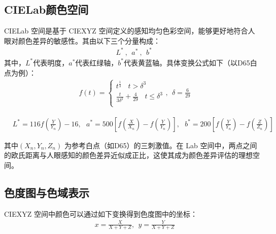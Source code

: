 \subsection[\hspace{-2pt}CIELab颜色空间]{{\heiti{} \hspace{-8pt}CIELab颜色空间}}\label{subsection2: CIELab颜色空间}

CIELab 空间是基于 CIEXYZ 空间定义的感知均匀色彩空间，能够更好地符合人眼对颜色差异的敏感性。其由以下三个分量构成：
\begin{equation}
\begin{aligned}
  &L^{*}\ ,\ \ a^{*}\ ,\ \ b^{*}\ 
\end{aligned}
\end{equation}
其中，$L^{*}$代表明度，$a^{*}$代表红绿轴，$b^{*}$代表黄蓝轴。具体变换公式如下（以D65白点为例）：
\begin{equation}
\begin{aligned}
  &f(t) = 
\begin{cases}
  t^{\frac{1}{3}}\ \ \ \ t>\delta^{3}\\
  \frac{t}{3\delta^{2}}+\frac{4}{29}\ \ \ \ t\leq \delta^{3}\\
\end{cases}
,\ \ \delta=\frac{6}{29}
\end{aligned}
\end{equation}

\begin{equation}
\begin{aligned}
  &L^{*} = 116f(\frac{Y}{Y_{n}})-16,\ \ \ a^{*}=500[f(\frac{X}{X_{n}})-f(\frac{Y}{Y_{n}})],\ \ \ b^{*} = 200[f(\frac{Y}{Y_{n}})-f(\frac{Z}{Z_{n}})]
\end{aligned}
\end{equation}

其中$(X_{n},Y_{n},Z_{n})$ 为参考白点（如D65）的三刺激值。在 Lab 空间中，两点之间的欧氏距离与人眼感知的颜色差异近似成正比，这使其成为颜色差异评估的理想空间。

\subsection[\hspace{-2pt}色度图与色域表示]{{\heiti{} \hspace{-8pt}色度图与色域表示}}\label{subsection2: 色度图与色域表示}

CIEXYZ 空间中颜色可以通过如下变换得到色度图中的坐标：
\begin{equation}
\begin{aligned}
  &x=\frac{X}{X+Y+Z},\ \ y=\frac{Y}{X+Y+Z}
\end{aligned}
\end{equation}

